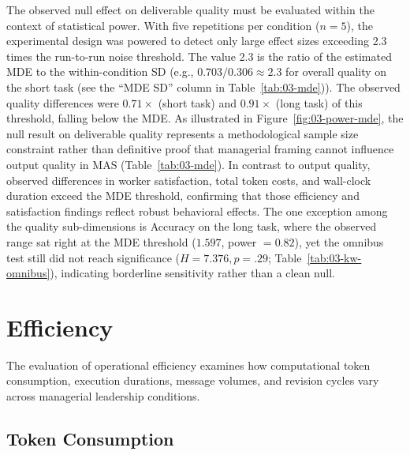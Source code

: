 The observed null effect on deliverable quality must be evaluated within the context of statistical power.
With five repetitions per condition ($n=5$), the experimental design was powered to detect only large effect sizes exceeding 2.3 times the run-to-run noise threshold.
The value 2.3 is the ratio of the estimated \ac{MDE} to the within-condition \ac{SD} (e.g., $0.703 / 0.306 \approx 2.3$ for overall quality on the short task (see the ``MDE SD'' column in Table~\ref{tab:03-mde})).
The observed quality differences were $0.71\times$ (short task) and $0.91\times$ (long task) of this threshold, falling below the \ac{MDE}.
As illustrated in Figure~\ref{fig:03-power-mde}, the null result on deliverable quality represents a methodological sample size constraint rather than definitive proof that managerial framing cannot influence output quality in \ac{MAS} (Table~\ref{tab:03-mde}).
In contrast to output quality, observed differences in worker satisfaction, total token costs, and wall-clock duration exceed the \ac{MDE} threshold, confirming that those efficiency and satisfaction findings reflect robust behavioral effects.
The one exception among the quality sub-dimensions is Accuracy on the long task, where the observed range sat right at the \ac{MDE} threshold ($1.597$, power $= 0.82$), yet the omnibus test still did not reach significance ($H = 7.376, p = .29$; Table~\ref{tab:03-kw-omnibus}), indicating borderline sensitivity rather than a clean null.

\section{Efficiency}
\label{sec:results-efficiency}

The evaluation of operational efficiency examines how computational token consumption, execution durations, message volumes, and revision cycles vary across managerial leadership conditions.

\subsection{Token Consumption}
\label{subsec:token-consumption}

